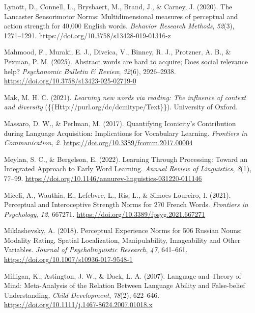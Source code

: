 \documentclass[
  man,floatsintext]{apa6}
\newlength{\cslhangindent}
\newenvironment{CSLReferences}[2] %
 {\begin{list}{}{%
  \setlength{\itemindent}{0pt}
  \setlength{\leftmargin}{0pt}
  \setlength{\parsep}{0pt}
  \ifodd #1
   \setlength{\leftmargin}{\cslhangindent}
   \setlength{\itemindent}{-1\cslhangindent}
  \fi
  \setlength{\itemsep}{#2\baselineskip}}}
 {\end{list}}
\begin{document}
\begin{CSLReferences}{1}{0}
Lynott, D., Connell, L., Brysbaert, M., Brand, J., \& Carney, J. (2020). The {Lancaster Sensorimotor Norms}: Multidimensional measures of perceptual and action strength for 40,000 {English} words. \emph{Behavior Research Methods}, \emph{52}(3), 1271--1291. \url{https://doi.org/10.3758/s13428-019-01316-z}

Mahmood, F., Muraki, E. J., Diveica, V., Binney, R. J., Protzner, A. B., \& Pexman, P. M. (2025). Abstract words are hard to acquire; {Does} social relevance help? \emph{Psychonomic Bulletin \& Review}, \emph{32}(6), 2926--2938. \url{https://doi.org/10.3758/s13423-025-02719-0}

Mak, M. H. C. (2021). \emph{Learning new words via reading: The influence of context and diversity} (\{\{Http://purl.org/dc/dcmitype/Text\}\}). University of Oxford.

Massaro, D. W., \& Perlman, M. (2017). Quantifying {Iconicity}'s {Contribution} during {Language Acquisition}: {Implications} for {Vocabulary Learning}. \emph{Frontiers in Communication}, \emph{2}. \url{https://doi.org/10.3389/fcomm.2017.00004}

Meylan, S. C., \& Bergelson, E. (2022). Learning {Through Processing}: {Toward} an {Integrated Approach} to {Early Word Learning}. \emph{Annual Review of Linguistics}, \emph{8}(1), 77--99. \url{https://doi.org/10.1146/annurev-linguistics-031220-011146}

Miceli, A., Wauthia, E., Lefebvre, L., Ris, L., \& Simoes Loureiro, I. (2021). Perceptual and {Interoceptive Strength Norms} for 270 {French Words}. \emph{Frontiers in Psychology}, \emph{12}, 667271. \url{https://doi.org/10.3389/fpsyg.2021.667271}

Miklashevsky, A. (2018). Perceptual {Experience Norms} for 506 {Russian Nouns}: {Modality Rating}, {Spatial Localization}, {Manipulability}, {Imageability} and {Other Variables}. \emph{Journal of Psycholinguistic Research}, \emph{47}, 641--661. \url{https://doi.org/10.1007/s10936-017-9548-1}

Milligan, K., Astington, J. W., \& Dack, L. A. (2007). Language and {Theory} of {Mind}: {Meta-Analysis} of the {Relation Between Language Ability} and {False-belief Understanding}. \emph{Child Development}, \emph{78}(2), 622--646. \url{https://doi.org/10.1111/j.1467-8624.2007.01018.x}


\end{CSLReferences}
\end{document}
